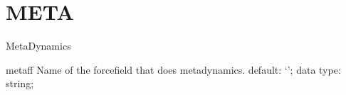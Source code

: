 \section{META}
\label{META}
\begin{ipifield}{}%
{MetaDynamics}%
{}%
{}
\begin{ipifield}{metaff}%
{Name of the forcefield that does metadynamics.}%
{default: `'; data type: string; }%
{}
\end{ipifield}
\end{ipifield}
